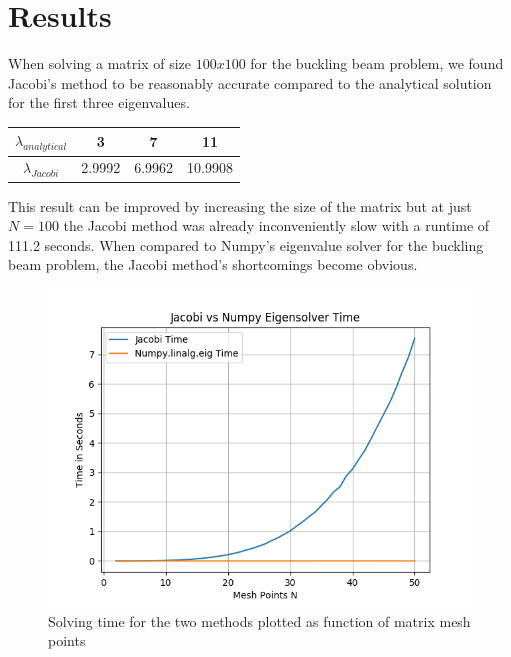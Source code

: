 \documentclass{emulateapj}
\begin{document}
\section{Results}
\label{sec:results}
When solving a matrix of size $100x100$ for the buckling beam problem, we found Jacobi's method to be reasonably accurate compared to the analytical solution for the first three eigenvalues.
\begin{center}
\begin{tabular}{ |c|c|c|c| }
\hline
$\lambda_{analytical}$ & 3 & 7 & 11 \\
\hline
$\lambda_{Jacobi}$ & 2.9992 & 6.9962 & 10.9908 \\
\hline
\end{tabular}
\end{center}
This result can be improved by increasing the size of the matrix but at just $N=100$ the Jacobi method was already inconveniently slow with a runtime of 111.2 seconds. When compared to Numpy's eigenvalue solver for the buckling beam problem, the Jacobi method's shortcomings become obvious.
\begin{figure}[H]
    \centering
    \includegraphics[scale=0.5]{jacobi_numpy_time.png}
    \caption{Solving time for the two methods plotted as function of matrix mesh points}
    \label{fig:1}
\end{figure}
\end{document}
